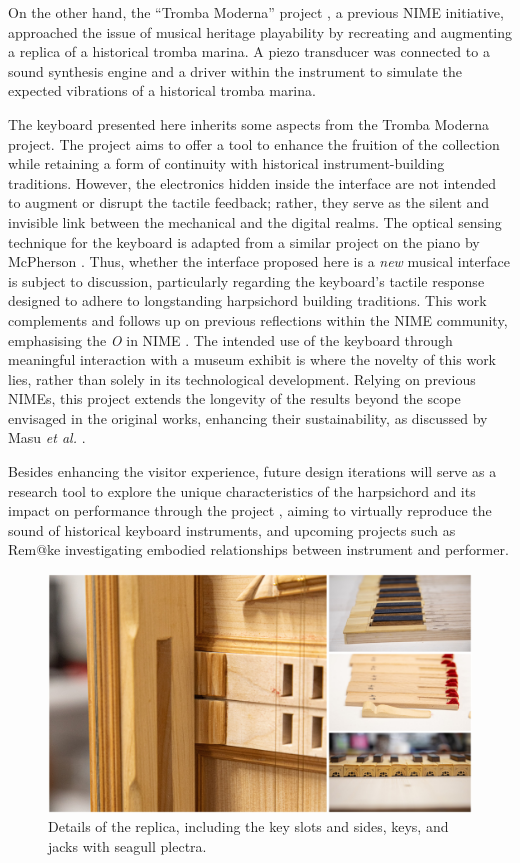 On the other hand, the ``Tromba Moderna'' project \cite{Baldwin2016}, a previous NIME initiative, approached the issue of musical heritage playability by recreating and augmenting a replica of a historical tromba marina. A piezo transducer was connected to a sound synthesis engine and a driver within the instrument to simulate the expected vibrations of a historical tromba marina. 


The keyboard presented here inherits some aspects from the Tromba Moderna project. The project aims to offer a tool to enhance the fruition of the  collection while retaining a form of continuity with historical instrument-building traditions. However, the electronics hidden inside the interface are not intended to augment or disrupt the tactile feedback; rather, they serve as the silent and invisible link between the mechanical and the digital realms. 
The optical sensing technique for the keyboard is adapted from a similar project on the piano by McPherson \cite{McPherson2013}. 
Thus, whether the interface proposed here is a \emph{new} musical interface is subject to discussion, particularly regarding the keyboard's tactile response designed to adhere to longstanding harpsichord building traditions. This work complements and follows up on previous reflections within the NIME community, emphasising the \emph{O} in NIME \cite{Masu_NIME_2023}. The intended use of the keyboard through meaningful interaction with a museum exhibit is where the novelty of this work lies, rather than solely in its technological development. Relying on previous NIMEs, this project extends the longevity of the results beyond the scope envisaged in the original works, enhancing their sustainability, as discussed by Masu \emph{et al.} \cite{Masu_NIME_2023}.

Besides enhancing the visitor experience, future design iterations will serve as a research tool to explore the unique characteristics of the harpsichord and its impact on performance through the  project , aiming to virtually reproduce the sound of historical keyboard instruments, and upcoming projects such as Rem@ke \cite{remake1} investigating embodied relationships between instrument and performer.

\begin{figure}
\centering
\includegraphics[width=0.8\linewidth]{src/images/details.jpg}
\caption{Details of the replica, including the key slots and sides, keys, and jacks with seagull plectra.}\label{fig:details}
\end{figure}

